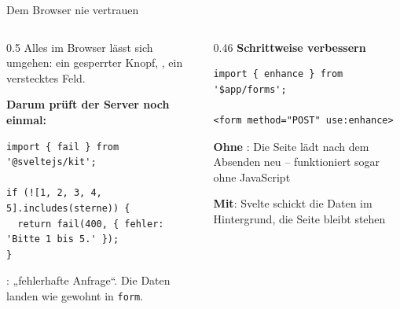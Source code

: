 \begin{frame}[fragile]{Dem Browser nie vertrauen}
  \begin{columns}[onlytextwidth,t]
    \begin{column}{0.5\textwidth}
      \footnotesize
      Alles im Browser lässt sich umgehen: ein gesperrter Knopf,
      , ein verstecktes Feld.

      \vspace{0.4em}
      \textbf{Darum prüft der Server noch einmal:}
\begin{lstlisting}[style=js,numbers=none]
import { fail } from '@sveltejs/kit';

if (![1, 2, 3, 4, 5].includes(sterne)) {
  return fail(400, { fehler: 'Bitte 1 bis 5.' });
}
\end{lstlisting}
      : „fehlerhafte Anfrage“. Die Daten landen
      wie gewohnt in \texttt{form}.
    \end{column}
    \begin{column}{0.46\textwidth}
      \footnotesize
      \textbf{Schrittweise verbessern}
\begin{lstlisting}[style=svelte,numbers=none]
import { enhance } from '$app/forms';

<form method="POST" use:enhance>
\end{lstlisting}
      \begin{tugitemize}
        \item \textbf{Ohne} : Die Seite lädt nach dem Absenden neu --
              funktioniert sogar ohne JavaScript
        \item \textbf{Mit}: Svelte schickt die Daten im Hintergrund,
              die Seite bleibt stehen
      \end{tugitemize}
    \end{column}
  \end{columns}
\end{frame}

